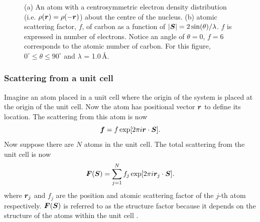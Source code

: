 \begin{figure}
\begin{subfigure}[b]{0.5\textwidth}
                        \caption{}
                        \label{fig:carbon atomic scattering factor}
                \end{subfigure}
                \caption[Centrosymmetric electron cloud and scattering factor from carbon]{(a) An atom with a centrosymmetric electron density distribution (i.e. $\rho(\boldsymbol{r}) = \rho(-\boldsymbol{r})$) about the centre of the nucleus.
                (b) atomic scattering factor, $f$, of carbon as a function of $|\boldsymbol{S}| = 2 \sin(\theta)/\lambda$.
                $f$ is expressed in number of electrons.
                Notice an angle of $\theta = 0$, $f=6$ corresponds to the atomic number of carbon.
                For this figure, $0^{\circ} \leq \theta \leq 90^{\circ}$ and $\lambda$ = 1.0$\,$\AA.}
        		\label{fig:Scattering from an atom}
            \end{figure}

        \subsubsection{Scattering from a unit cell}
        \label{subs:Scattering from a unit cell}
            Imagine an atom placed in a unit cell where the origin of the system is placed at the origin of the unit cell.
            Now the atom has positional vector $\boldsymbol{r}$ to define its location.
            The scattering from this atom is now
            \begin{equation}
                \boldsymbol{f} = f \exp[2 \pi i \boldsymbol{r} \cdot \boldsymbol{S}].
            \end{equation}
            Now suppose there are $N$ atoms in the unit cell. The total scattering from the unit cell is now
            \begin{equation}
                \boldsymbol{F}(\boldsymbol{S}) = \sum_{j=1}^N f_j \exp[2 \pi i \boldsymbol{r}_j \cdot \boldsymbol{S}].
                \label{eq:structure factor equation - summation}
            \end{equation}
            where $\boldsymbol{r}_j$ and $f_j$ are the position and atomic scattering factor of the $j$-th atom respectively.
            $\boldsymbol{F}(\boldsymbol{S})$ is referred to as the structure factor because it depends on the structure of the atoms within the unit cell \cite{drenth2012}.

